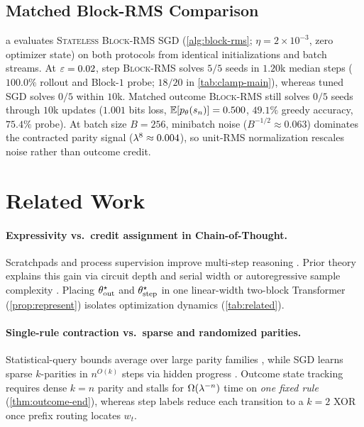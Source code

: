 \subsection{Matched Block-RMS Comparison}

a evaluates \textsc{Stateless Block-RMS SGD} (\cref{alg:block-rms}; $\eta = 2\times 10^{-3}$, zero optimizer state) on both protocols from identical initializations and batch streams. At $\varepsilon = 0.02$, step \textsc{Block-RMS} solves $5/5$ seeds in $1.20$k median steps ($100.0\%$ rollout and Block-$1$ probe; $18/20$ in \cref{tab:clamp-main}), whereas tuned SGD solves $0/5$ within $10$k. Matched outcome \textsc{Block-RMS} still solves $0/5$ seeds through $10$k updates ($1.001$ bits loss, $\mathbb E[p_\theta(s_n)] = 0.500$, $49.1\%$ greedy accuracy, $75.4\%$ probe). At batch size $B = 256$, minibatch noise ($B^{-1/2} \approx 0.063$) dominates the contracted parity signal ($\lambda^8 \approx 0.004$), so unit-RMS normalization rescales noise rather than outcome credit.

\section{Related Work}
\label{sec:related}

\paragraph{Expressivity vs.\ credit assignment in Chain-of-Thought.}
Scratchpads and process supervision improve multi-step reasoning \citep{nye2021scratchpads,wei2022cot,lightman2023verify,prystawski2023think,jia2025verify}. Prior theory explains this gain via circuit depth and serial width \citep{feng2023towards,liu2023automata,merrill2024expressive,magen2026neuron} or autoregressive sample complexity \citep{wies2023subtask,malach2023autoregressive,abbe2024globality,pmlr-v291-joshi25a,pmlr-v267-li25r,hanneke2026samplecomplexityautoregressivereasoning}. Placing $\theta^\star_{\mathrm{out}}$ and $\theta^\star_{\mathrm{step}}$ in one linear-width two-block Transformer (\cref{prop:represent}) isolates optimization dynamics (\cref{tab:related}).

\paragraph{Single-rule contraction vs.\ sparse and randomized parities.}
Statistical-query bounds average over large parity families \citep{kearns1998efficient,shalevshwartz2017failures,reyzin2020statistical,abbe2025parities,pmlr-v336-giapitzakis26a}, while SGD learns sparse $k$-parities in $n^{O(k)}$ steps via hidden progress \citep{barak2022hidden,abbe2021staircase,abbe2022mergedstaircase,abbe2023sgd,damian2022representations,ba2022onestep,hahn2024sensitive,wang2025compositional}. Outcome state tracking requires dense $k = n$ parity and stalls for $\Omega(\lambda^{-n})$ time on \emph{one fixed rule} (\cref{thm:outcome-end}), whereas step labels reduce each transition to a $k = 2$ XOR once prefix routing locates $w_t$.

